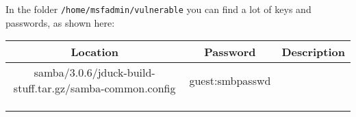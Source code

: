 \begin{enumerate}
    In the folder \texttt{/home/msfadmin/vulnerable} you can find a lot of keys and passwords, as shown here:
    \begin{table}[!h]
        \centering
        \begin{tabular}{|c|c|c|}
        \hline
        \textbf{Location} & \textbf{Password} & \textbf{Description} \\ \hline
        samba/3.0.6/jduck-build-stuff.tar.gz/samba-common.config & guest:smbpasswd &                      \\ \hline
                          &                   &                      \\ \hline
                          &                   &                      \\ \hline
                          &                   &                      \\ \hline
        \end{tabular}
    \end{table}

\end{enumerate}